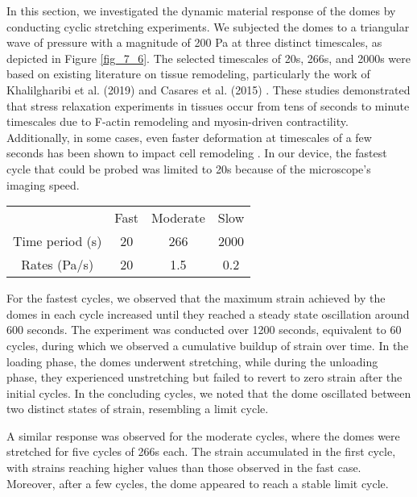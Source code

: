 In this section, we investigated the dynamic material response of the domes by conducting cyclic stretching experiments. We subjected the domes to a triangular wave of pressure with a magnitude of 200 Pa at three distinct timescales, as depicted in Figure \ref{fig_7_6}. The selected timescales of 20s, 266s, and 2000s were based on existing literature on tissue remodeling, particularly the work of Khalilgharibi et al. (2019) and Casares et al. (2015) \cite{khalilgharibi2019, casares2015}. These studies demonstrated that stress relaxation experiments in tissues occur from tens of seconds to minute timescales due to F-actin remodeling and myosin-driven contractility. Additionally, in some cases, even faster deformation at timescales of a few seconds has been shown to impact cell remodeling \cite{andreu2021a}. In our device, the fastest cycle that could be probed was limited to 20s because of the microscope's imaging speed.

\begin{center}
	\begin{table}[h!]
		\label{tab:hysteresis}
		\begin{tabular}{c c c c}
			& Fast & Moderate & Slow \\ 
			Time period (s) & 20   & 266      & 2000 \\ 
			Rates (Pa/s)    & 20   & 1.5      & 0.2  \\ 
		\end{tabular}
	\end{table}
\end{center}

For the fastest cycles, we observed that the maximum strain achieved by the domes in each cycle increased until they reached a steady state oscillation around 600 seconds. The experiment was conducted over 1200 seconds, equivalent to 60 cycles, during which we observed a cumulative buildup of strain over time. In the loading phase, the domes underwent stretching, while during the unloading phase, they experienced unstretching but failed to revert to zero strain after the initial cycles. In the concluding cycles, we noted that the dome oscillated between two distinct states of strain, resembling a limit cycle.

A similar response was observed for the moderate cycles, where the domes were stretched for five cycles of 266s each. The strain accumulated in the first cycle, with strains reaching higher values than those observed in the fast case. Moreover, after a few cycles, the dome appeared to reach a stable limit cycle.

